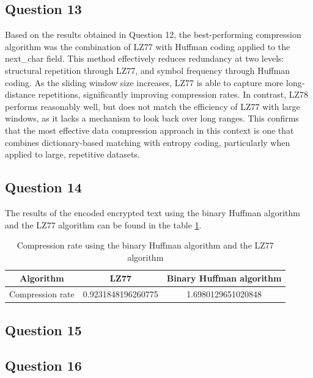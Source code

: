\documentclass[]{template}
\begin{document}
    \subsection{Question 13}

    Based on the results obtained in Question 12, the best-performing compression algorithm was the combination of LZ77 with Huffman coding applied to the next\_char field. 
    This method effectively reduces redundancy at two levels: structural repetition through LZ77, and symbol frequency through Huffman coding. 
    As the sliding window size increases, LZ77 is able to capture more long-distance repetitions, significantly improving compression rates. 
    In contrast, LZ78 performs reasonably well, but does not match the efficiency of LZ77 with large windows, as it lacks a mechanism to look back over long ranges. 
    This confirms that the most effective data compression approach in this context is one that combines dictionary-based matching with entropy coding, particularly when applied to large, repetitive datasets.    

    \subsection{Question 14}

    The results of the encoded encrypted text using the binary Huffman algorithm and the LZ77 algorithm 
    can be found in the table \ref{tab:binary_huffman_lz77}.

    \begin{table}[ht]
        \centering
        \begin{tabular}{|c|c|c|}
        \hline
        Algorithm        & LZ77               & Binary Huffman algorithm \\ \hline
        Compression rate & 0.9231848196260775 & 1.6980129651020848       \\ \hline
        \end{tabular}
        \caption{Compression rate using the binary Huffman algorithm and the LZ77 algorithm}\label{tab:binary_huffman_lz77}
    \end{table}

    \subsection{Question 15}

    \subsection{Question 16}
\end{document}
